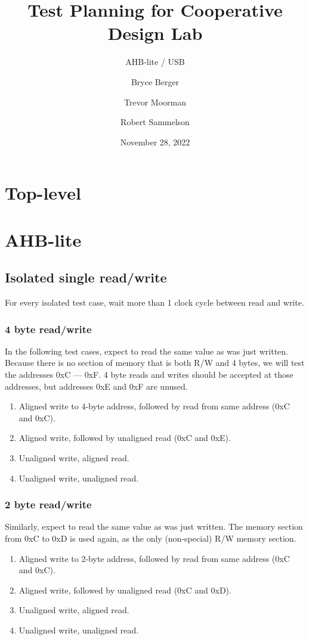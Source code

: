 \documentclass{scrartcl}
\title{Test Planning for Cooperative Design Lab}
\subtitle{AHB-lite / USB}
\author{ Bryce Berger \and Trevor Moorman \and Robert Sammelson }
\date{November 28, 2022}
\begin{document}
\maketitle
\tableofcontents
\newpage

\section{Top-level}

\section{AHB-lite}

\subsection{Isolated single read/write}

For every isolated test case, wait more than 1 clock cycle between read and write.

\subsubsection{4 byte read/write}
\label{s4brr}
In the following test cases, expect to read the same value as was just written. Because there is no section of memory that is both R/W and 4 bytes, we will test the addresses 0xC --- 0xF. 4 byte reads and writes should be accepted at those addresses, but addresses 0xE and 0xF are unused.
\begin{enumerate}
    \item Aligned write to 4-byte address, followed by read from same address (0xC and 0xC).
    \item Aligned write, followed by unaligned read (0xC and 0xE).
    \item Unaligned write, aligned read.
    \item Unaligned write, unaligned read.
\end{enumerate}

\subsubsection{2 byte read/write}
\label{s2brr}
Similarly, expect to read the same value as was just written. The memory section from 0xC to 0xD is used again, as the only (non-special) R/W memory section.
\begin{enumerate}
    \item Aligned write to 2-byte address, followed by read from same address (0xC and 0xC).
    \item Aligned write, followed by unaligned read (0xC and 0xD).
    \item Unaligned write, aligned read.
    \item Unaligned write, unaligned read.
\end{enumerate}
\end{document}
